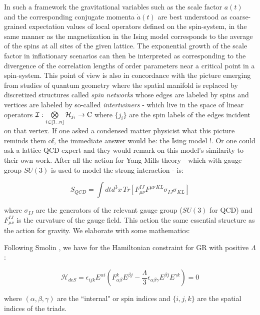 \begin{doublespace}
In such a framework the gravitational variables such as the scale factor $a(t)$ and the corresponding conjugate momenta $\dot a(t)$ are best understood as coarse-grained expectation values of local operators defined on the spin-system, in the same manner as the magnetization in the Ising model corresponds to the average of the spins at all sites of the given lattice. The exponential growth of the scale factor in inflationary scenarios can then be interpreted as corresponding to the divergence of the correlation lengths of order parameters near a critical point in a spin-system. This point of view is also in concordance with the picture emerging from studies of quantum geometry where the spatial manifold is replaced by discretized structures called \emph{spin networks} whose edges are labeled by spins and vertices are labeled by so-called \emph{intertwiners} - which live in the space of linear operators $\mathcal{I} : \bigotimes\limits_{i \in [1..n]} \mathcal{H}_{j_{i}} \rightarrow \rm{C}$ where $\{j_{i}\}$ are the spin labels of the edges incident on that vertex. If one asked a condensed matter physicist what this picture reminds them of, the immediate answer would be: the Ising model !. Or one could ask a lattice QCD expert and they would remark on this model's similarity to their own work. After all the action for Yang-Mills theory - which with gauge group $SU(3)$ is used to model the strong interaction - is:

\begin{equation}
	S_{QCD} = \int dt d^{3}x\, Tr [ F_{\mu\nu}^{IJ}F^{\mu\nu \, KL} \sigma_{IJ} \sigma_{KL} ]
\end{equation}

where $\sigma_{IJ}$ are the generators of the relevant gauge group ($SU(3)$ for QCD) and $F^{IJ}_{\mu\nu}$ is the curvature of the gauge field. This action the same essential structure as the action for gravity. We elaborate with some mathematics:

Following Smolin \cite{Smolin2002Quantum}, we have for the Hamiltonian constraint for GR with positive $\Lambda$:

\begin{equation}\label{eqn:deSitterHamiltonian}
	\mathcal{H}_{deS} = \epsilon_{ijk} E^{\alpha i} \left ( F^{k}_{\alpha \beta} E^{\beta j} - \frac{\Lambda}{3}\epsilon_{\alpha \beta \gamma} E^{\beta j} E^{\gamma k} \right) = 0
\end{equation}

where $ (\alpha, \beta, \gamma) $ are the ``internal" or spin indices and $ \{ i,j,k \} $ are the spatial indices of the triads.


\end{doublespace}
